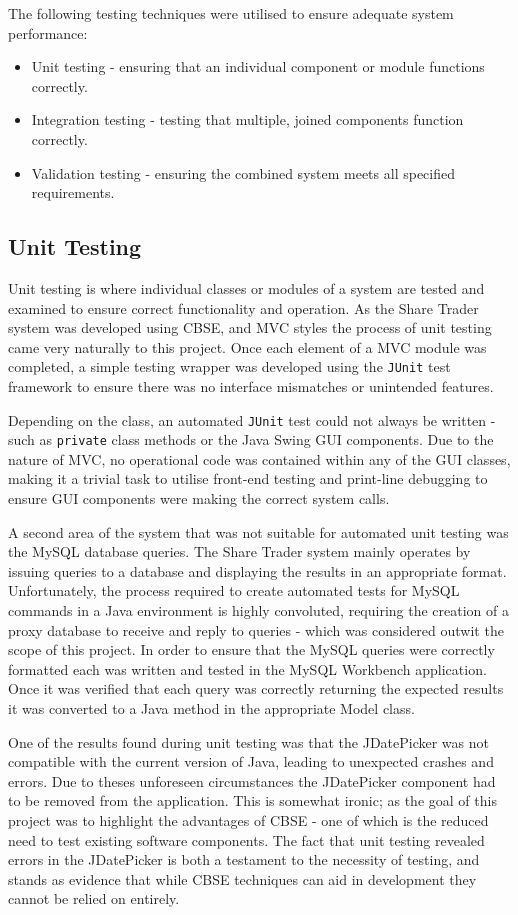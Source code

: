 \documentclass[12pt, a4paper,titlepage]{article}
\begin{document}
The following testing techniques were utilised to ensure adequate system
performance:
\begin{itemize}
    \item Unit testing - ensuring that an individual component or module
    functions correctly.
    \item Integration testing - testing that multiple, joined components
    function correctly.
    \item Validation testing - ensuring the combined system meets all
    specified requirements.
\end{itemize}

\subsection{Unit Testing}
Unit testing is where individual classes or modules of a system are tested and
examined to ensure correct functionality and operation. 
As the Share Trader system was developed using CBSE, and MVC styles the
process of unit testing came very naturally to this project.  
Once each element of a MVC module was completed, a simple testing wrapper was
developed  using the {\tt JUnit} test framework to ensure there was no interface
mismatches or unintended features.

Depending on the class, an automated {\tt JUnit} test could not always be
written - such as {\tt private} class methods or the Java Swing GUI components. 
Due to the nature of MVC, no operational code was contained within any of the
GUI classes, making it a trivial task to utilise front-end testing and
print-line debugging to ensure GUI components were making the correct system
calls.

A second area of the system that was not suitable for automated unit testing
was the MySQL database queries. 
The Share Trader system mainly operates by issuing queries to a database and
displaying the results in an appropriate format. 
Unfortunately, the process required to create automated tests for
MySQL commands in a Java environment is highly convoluted, requiring the
creation of a proxy database to receive and reply to queries - which was
considered outwit the scope of this project. 
In order to ensure that the MySQL queries were correctly formatted each was
written and tested in the MySQL Workbench application. 
Once it was verified that each query was correctly returning the expected
results it was converted to a Java method in the appropriate Model class.

One of the results  found during  unit testing was that the JDatePicker was
not compatible with the current version of Java, leading to unexpected crashes
and errors.
Due to theses unforeseen circumstances the JDatePicker component had to be
removed from the application.
This is somewhat ironic; as the goal of this project was to highlight the
advantages of CBSE - one of which is the reduced need to test existing
software components.
The fact that unit testing revealed errors in the JDatePicker is both a
testament to the necessity of testing, and stands as evidence that while CBSE
techniques can aid in development they cannot be relied on entirely.
\end{document}

